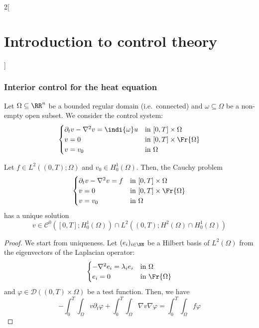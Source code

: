 \documentclass[../../../main_math.tex]{subfiles}
\begin{document}
\begin{multicols}{2}[\section{Introduction to control theory}]
  \subsubsection{Interior control for the heat equation}
  Let $\Omega\subseteq \RR^n$ be a bounded regular domain (i.e.\ connected) and $\omega\subseteq \Omega$ be a non-empty open subset. We consider the control system:
  \begin{equation}\label{ICT:heat_equation_control}
    \begin{cases}
      \partial_t v - \laplacian v = \indi{\omega}u & \text{in } [0,T] \times \Omega      \\
      v = 0                                        & \text{in } [0,T] \times \Fr{\Omega} \\
      v = v_0                                      & \text{in } \Omega
    \end{cases}
  \end{equation}
  \begin{theorem}
    Let $f\in L^2((0,T);\Omega)$ and $v_0\in H_0^1(\Omega)$. Then, the Cauchy problem
    \begin{equation}\label{ICT:heat_equation_cauchy}
      \begin{cases}
        \partial_t v - \laplacian v = f & \text{in } [0,T] \times \Omega      \\
        v = 0                           & \text{in } [0,T] \times \Fr{\Omega} \\
        v = v_0                         & \text{in } \Omega
      \end{cases}
    \end{equation}
    has a unique solution $$v\in \mathcal{C}^0([0,T]; H_0^1(\Omega))\cap L^2((0,T); H^2(\Omega)\cap H_0^1(\Omega))$$
  \end{theorem}
  \begin{proof}
    We start from uniqueness. Let $(e_i)_{i\in\NN}$ be a Hilbert basis of $L^2(\Omega)$ from the eigenvectors of the Laplacian operator:
    $$
      \begin{cases}
        -\laplacian e_i = \lambda_i e_i & \text{in } \Omega      \\
        e_i = 0                         & \text{in } \Fr{\Omega}
      \end{cases}
    $$
    and $\varphi\in \mathcal{D}((0,T)\times \Omega)$ be a test function. Then, we have
    $$
      -\int_0^T\int_\Omega v \partial_t \varphi + \int_0^T\int_\Omega \nabla v \nabla \varphi = \int_0^T\int_\Omega f\varphi
$$
\end{proof}
\end{multicols}
\end{document}
